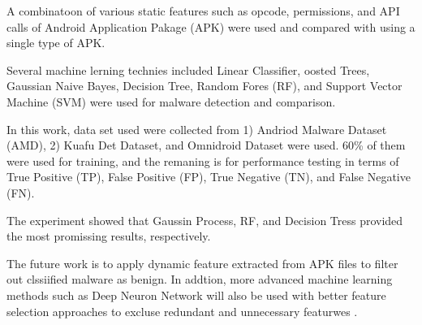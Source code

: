 \documentclass[a4paper, 12pt]{report}
\begin{document}
	A combinatoon of various  static features such as opcode, permissions, and API calls of Android Application Pakage (APK) were used and compared with using a single type of APK. 
	
	Several machine lerning technies included Linear Classifier, oosted Trees, Gaussian Naive Bayes, Decision Tree, Random Fores (RF), and Support Vector Machine (SVM) were used for malware detection and comparison. 
	
	In this work, data set used were collected from 1) Andriod Malware Dataset (AMD), 2) Kuafu Det Dataset, and Omnidroid Dataset were used.  60\% of them were used for training, and the remaning is for performance testing in terms of True Positive (TP), False Positive (FP), True Negative (TN), and False Negative (FN). 
	
	The experiment showed that Gaussin Process, RF, and Decision Tress provided the most promissing results, respectively.
	
	The future work is to apply dynamic feature extracted from APK files to filter out clssiified malware as benign.  In addtion, more advanced machine learning methods such as Deep Neuron Network will also be used with better feature selection approaches to excluse redundant and unnecessary featurwes .

	\newpage
	
	
\end{document}
